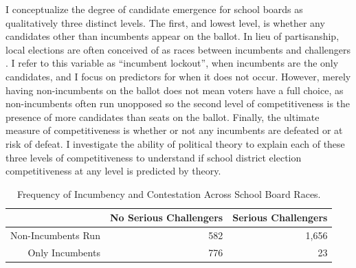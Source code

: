 I conceptualize the degree of candidate emergence for school boards as qualitatively 
three distinct levels. The first, and lowest level, is whether any candidates other 
than incumbents appear on the ballot. In lieu of partisanship, local elections are 
often conceived of as races between incumbents and challengers \citep{oliver07,oliver12}. 
I refer to this variable as ``incumbent lockout'', when incumbents are the only 
candidates, and I focus on predictors for when it does not occur. However, merely 
having non-incumbents on the ballot does not mean voters have a full choice, 
as non-incumbents often run unopposed so the second level of competitiveness is the 
presence of more candidates than seats on the ballot. Finally, the ultimate measure of 
competitiveness is whether or not any incumbents are defeated or at risk of defeat. 
I investigate the ability of political theory to explain each of these three levels 
of competitiveness to understand if school district election competitiveness at any 
level is predicted by theory. 

\begin{table}[ht]
\centering
\begin{tabular}{rrr}
  \hline
 & No Serious Challengers & Serious Challengers \\ 
  \hline
Non-Incumbents Run & 582 & 1,656 \\ 
  Only Incumbents & 776 & 23 \\ 
   \hline
\end{tabular}
\caption{Frequency of Incumbency and Contestation Across School Board Races.} 
\label{tab:icbychal}
\end{table}


